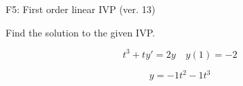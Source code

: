\begin{exercise}
  \begin{exerciseTitle}F5: First order linear IVP (ver. 13)\end{exerciseTitle}
  \begin{exerciseStatement}
    
Find the solution to the given IVP.

    
\[t^{3} +ty'= 2 y \hspace{1em} y( 1 ) = -2\]

  \end{exerciseStatement}
  \begin{exerciseAnswer}
    
\[y= -1 t^ 2 -1 t^{3}\]

  \end{exerciseAnswer}
\end{exercise}